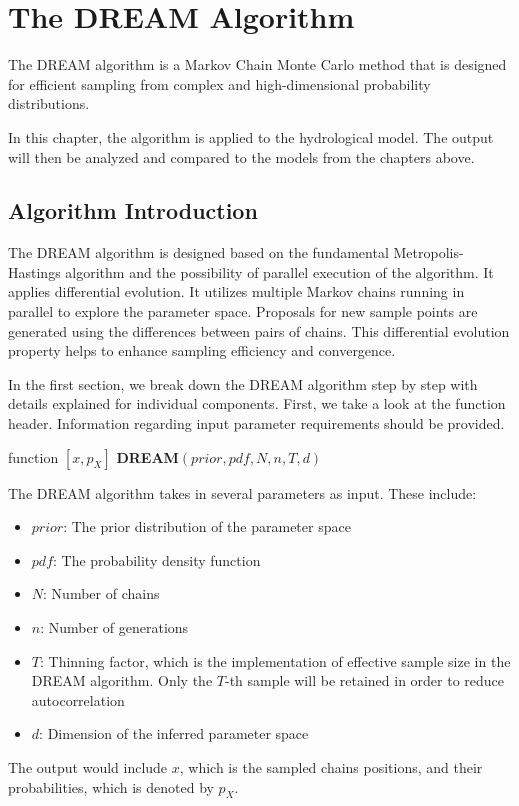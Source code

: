 \chapter{The DREAM Algorithm}
The DREAM algorithm is a Markov Chain Monte Carlo method that is designed for efficient sampling from complex and high-dimensional probability distributions. 

In this chapter, the algorithm is applied to the hydrological model. The output will then be analyzed and compared to the models from the chapters above.

\section{Algorithm Introduction}
The DREAM algorithm is designed based on the fundamental Metropolis-Hastings algorithm and the possibility of parallel execution of the algorithm. It applies differential evolution. It utilizes multiple Markov chains running in parallel to explore the parameter space. Proposals for new sample points are generated using the differences between pairs of chains. This differential evolution property helps to enhance sampling efficiency and convergence. 


In the first section, we break down the DREAM algorithm step by step with details explained for individual components.\cite{dream} First, we take a look at the function header. Information regarding input parameter requirements should be provided.

\begin{algorithm}[H]
function $[x, p_X]$ \gets \textbf{DREAM}$(prior, pdf, N, n, T, d)$
\end{algorithm}

The DREAM algorithm takes in several parameters as input. These include:
\begin{itemize}
    \item $prior$: The prior distribution of the parameter space
    \item $pdf$: The probability density function
    \item $N$: Number of chains
    \item $n$: Number of generations
    \item $T$: Thinning factor, which is the implementation of effective sample size in the DREAM algorithm. Only the $T$-th sample will be retained in order to reduce autocorrelation\cite{dream}
    \item $d$: Dimension of the inferred parameter space
\end{itemize}
The output would include $x$, which is the sampled chains positions, and their probabilities, which is denoted by $p_X$.

